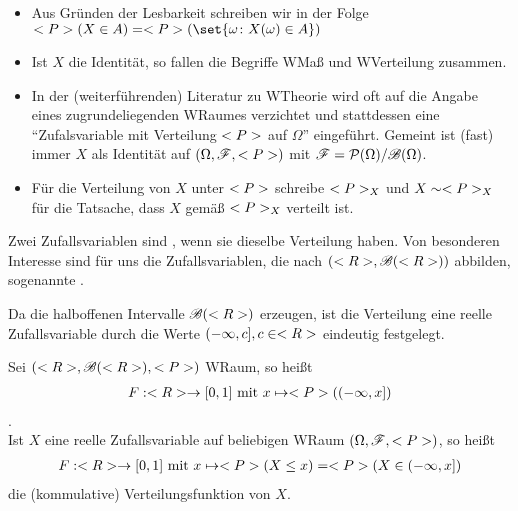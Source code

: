 \begin{*remark}
	\begin{itemize}
		\item Aus Gründen der Lesbarkeit schreiben wir in der Folge $\probp(X \in A) = \probp(\set{\omega \colon X(\omega) \in A})$
		\item Ist $X$ die Identität, so fallen die Begriffe WMaß und WVerteilung zusammen.
		\item In der (weiterführenden) Literatur zu WTheorie wird oft auf die Angabe eines zugrundeliegenden WRaumes verzichtet und stattdessen eine ``Zufalsvariable mit Verteilung $<P>$ auf $\Omega$'' eingeführt.
		Gemeint ist (fast) immer $X$ als Identität auf $(\Omega, \mathscr{F}, <P>)$ mit $\mathscr{F} = \mathcal{P}(\Omega) / \mathscr{B}(\Omega)$.
		\item Für die Verteilung von $X$ unter $<P>$ schreibe $<P>_{X}$ und $X \sim <P>_{X}$ für die Tatsache, dass $X$ gemäß $<P>_{X}$ verteilt ist.
	\end{itemize}
\end{*remark}

\begin{definition}
	Zwei Zufallsvariablen sind , wenn sie dieselbe Verteilung haben.
	Von besonderen Interesse sind für uns die Zufallsvariablen, die nach $(<R>, \mathscr{B}(<R>))$ abbilden, sogenannte .
\end{definition}

Da die halboffenen Intervalle $\mathscr{B}(<R>)$ erzeugen, ist die Verteilung eine reelle Zufallsvariable durch die Werte $(-\infty, c], c \in <R>$ eindeutig festgelegt.

\begin{definition}
	Sei $(<R>, \mathscr{B}(<R>), <P>)$ WRaum, so heißt
	\begin{align}
		F: <R> \to [0,1] \text{ mit } x \mapsto <P>((-\infty, x]) \notag
	\end{align}
	.\\
	Ist $X$ eine reelle Zufallsvariable auf beliebigen WRaum $(\Omega, \mathscr{F}, <P>)$, so heißt
	\begin{align}
		F: <R> \to [0,1] \text{ mit } x \mapsto <P>(X \le x) = <P>(X \in (-\infty, x]) \notag
	\end{align} %
	die (kommulative) Verteilungsfunktion von $X$.
\end{definition}


